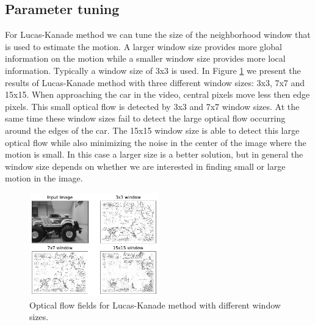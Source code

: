 \documentclass[9pt]{IEEEtran}
\begin{document}
\subsection*{Parameter tuning}
For Lucas-Kanade method we can tune the size of the neighborhood window that is used to estimate the motion.
A larger window size provides more global information on the motion while a smaller window size provides more local information.
Typically a window size of 3x3 is used. In Figure \ref{lk-window} we present the results of Lucas-Kanade method with three different window sizes: 3x3, 7x7 and 15x15.
When approaching the car in the video, central pixels move less then edge pixels.
This small optical flow is detected by 3x3 and 7x7 window sizes.
At the same time these window sizes fail to detect the large optical flow occurring around the edges of the car.
The 15x15 window size is able to detect this large optical flow while also minimizing the noise in the center of the image where the motion is small.
In this case a larger size is a better solution, but in general the window size depends on whether we are interested in finding small or large motion in the image.
\begin{figure}[H]
    \centering
    \includegraphics[width=0.5\textwidth]{LK_window.pdf}
    \vspace{-15px}
    \caption{Optical flow fields for Lucas-Kanade method with different window sizes.}
    \label{lk-window}
\end{figure}
\end{document}
